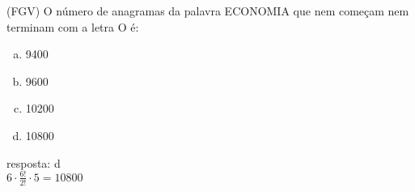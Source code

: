 \begin{ex}
(FGV) O número de anagramas da palavra ECONOMIA que nem começam nem terminam com a letra O é:
   \begin{enumerate}[(a)]
   \item 9400
   \item 9600
   \item 10200
   \item 10800
   \end{enumerate}
     \begin{sol}
      resposta: d \\
      $6\cdot\frac{6!}{2!}\cdot5=10800$
     \end{sol}
\end{ex}